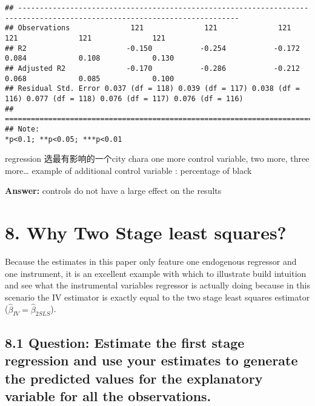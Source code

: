 \documentclass[
]{article}
\begin{document}
\begin{verbatim}
## -------------------------------------------------------------------------------------------------------------------------
## Observations              121              121              121              121              121              121       
## R2                       -0.150           -0.254           -0.172           0.084            0.108            0.130      
## Adjusted R2              -0.170           -0.286           -0.212           0.068            0.085            0.100      
## Residual Std. Error 0.037 (df = 118) 0.039 (df = 117) 0.038 (df = 116) 0.077 (df = 118) 0.076 (df = 117) 0.076 (df = 116)
## =========================================================================================================================
## Note:                                                                                         *p<0.1; **p<0.05; ***p<0.01
\end{verbatim}

regression 选最有影响的一个city chara one more control variable, two
more, three more\ldots{} example of additional control variable :
percentage of black

\textbf{Answer:} controls do not have a large effect on the results

\clearpage

\hypertarget{why-two-stage-least-squares}{%
\section{\texorpdfstring{8. Why \textbf{Two Stage} least
squares?}{8. Why Two Stage least squares?}}\label{why-two-stage-least-squares}}

Because the estimates in this paper only feature one endogenous
regressor and one instrument, it is an excellent example with which to
illustrate build intuition and see what the instrumental variables
regressor is actually doing because in this scenario the IV estimator is
exactly equal to the two stage least squares estimator
(\(\hat{\beta}_{IV}=\hat{\beta}_{2SLS}\)).

\hypertarget{question-estimate-the-first-stage-regression-and-use-your-estimates-to-generate-the-predicted-values-for-the-explanatory-variable-for-all-the-observations.}{%
\subsection{8.1 Question: Estimate the first stage regression and use
your estimates to generate the predicted values for the explanatory
variable for all the
observations.}\label{question-estimate-the-first-stage-regression-and-use-your-estimates-to-generate-the-predicted-values-for-the-explanatory-variable-for-all-the-observations.}}
\end{document}
